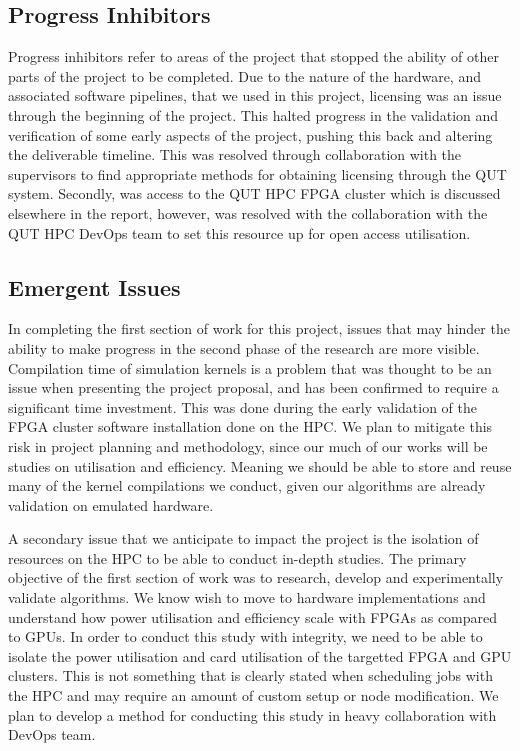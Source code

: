 \documentclass[11pt, a4paper]{article}
\begin{document}
	\subsection{Progress Inhibitors}
	Progress inhibitors refer to areas of the project that stopped the ability of other parts of the project to be completed. Due to the nature of the hardware, and associated software pipelines, that we used in this project, licensing was an issue through the beginning of the project. This halted progress in the validation and verification of some early aspects of the project, pushing this back and altering the deliverable timeline. This was resolved through collaboration with the supervisors to find appropriate methods for obtaining licensing through the QUT system. Secondly, was access to the QUT HPC FPGA cluster which is discussed elsewhere in the report, however, was resolved with the collaboration with the QUT HPC DevOps team to set this resource up for open access utilisation. 
	
	\subsection{Emergent Issues}
	In completing the first section of work for this project, issues that may hinder the ability to make progress in the second phase of the research are more visible. Compilation time of simulation kernels is a problem that was thought to be an issue when presenting the project proposal, and has been confirmed to require a significant time investment. This was done during the early validation of the FPGA cluster software installation done on the HPC. We plan to mitigate this risk in project planning and methodology, since our much of our works will be studies on utilisation and efficiency. Meaning we should be able to store and reuse many of the kernel compilations we conduct, given our algorithms are already validation on emulated hardware. 
	
	A secondary issue that we anticipate to impact the project is the isolation of resources on the HPC to be able to conduct in-depth studies. The primary objective of the first section of work was to research, develop and experimentally validate algorithms. We know wish to move to hardware implementations and understand how power utilisation and efficiency scale with FPGAs as compared to GPUs. In order to conduct this study with integrity, we need to be able to isolate the power utilisation and card utilisation of the targetted FPGA and GPU clusters. This is not something that is clearly stated when scheduling jobs with the HPC and may require an amount of custom setup or node modification. We plan to develop a method for conducting this study in heavy collaboration with DevOps team. 
	
\end{document}
